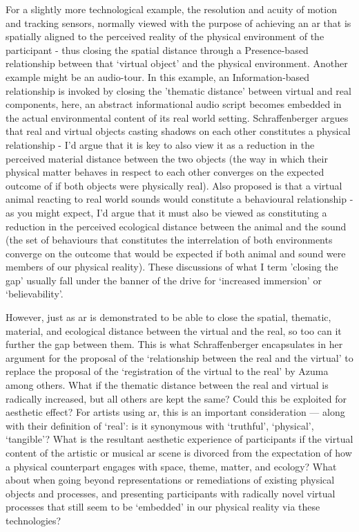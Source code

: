 For a slightly more technological example, the resolution and acuity of motion and tracking sensors, normally viewed with the purpose of achieving an \gls{ar} that is spatially aligned to the perceived reality of the physical environment of the participant - thus closing the spatial distance through a Presence-based relationship between that `virtual object' and the physical environment. Another example might be an audio-tour. In this example, an Information-based relationship is invoked by closing the 'thematic distance' between virtual and real components, here, an abstract informational audio script becomes embedded in the actual environmental content of its real world setting. Schraffenberger argues that real and virtual objects casting shadows on each other constitutes a physical relationship - I'd argue that it is key to also view it as a reduction in the perceived material distance between the two objects (the way in which their physical matter behaves in respect to each other converges on the expected outcome of if both objects were physically real). Also proposed is that a virtual animal reacting to real world sounds would constitute a behavioural relationship - as you might expect, I'd argue that it must also be viewed as constituting a reduction in the perceived ecological distance between the animal and the sound (the set of behaviours that constitutes the interrelation of both environments converge on the outcome that would be expected if both animal and sound were members of our physical reality). These discussions of what I term 'closing the gap' usually fall under the banner of the drive for `increased immersion' or `believability'. 

However, just as \gls{ar} is demonstrated to be able to close the spatial, thematic, material, and ecological distance between the virtual and the real, so too can it further the gap between them. This is what Schraffenberger encapsulates in her argument for the proposal of the `relationship between the real and the virtual' to replace the proposal of the `registration of the virtual to the real' by Azuma among others. What if the thematic distance between the real and virtual is radically increased, but all others are kept the same? Could this be exploited for aesthetic effect? For artists using \gls{ar}, this is an important consideration — along with their definition of `real': is it synonymous with `truthful', `physical', `tangible'? What is the resultant aesthetic experience of participants if the virtual content of the artistic or musical \gls{ar} scene is divorced from the expectation of how a physical counterpart engages with space, theme, matter, and ecology? What about when going beyond representations or remediations of existing physical objects and processes, and presenting participants with radically novel virtual processes that still seem to be `embedded' in our physical reality via these technologies?

